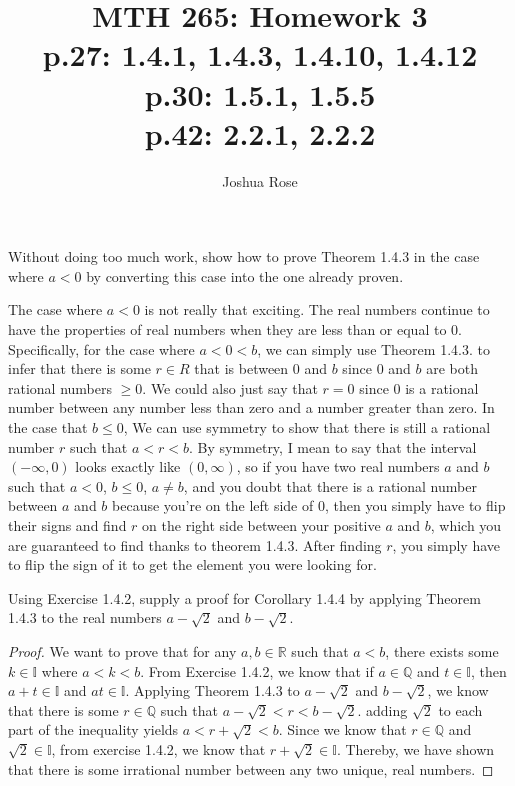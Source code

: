 \documentclass[12pt]{article}
\newcommand{\R}{\mathbb{R}}
\newcommand{\Q}{\mathbb{Q}}
\newcommand{\I}{\mathbb{I}}
\newenvironment{exercise}[2][Exercise]{\begin{trivlist}
\item[\hskip \labelsep {\bfseries #1}\hskip \labelsep {\bfseries #2.}]}{\end{trivlist}}
\begin{document}
 
 
\title{MTH 265: Homework 3\\
\normalsize 
p.27: 1.4.1, 1.4.3, 1.4.10, 1.4.12\\
p.30: 1.5.1, 1.5.5\\
p.42: 2.2.1, 2.2.2}
\author{Joshua Rose}
 
\maketitle


\begin{exercise}{1.4.1}
Without doing too much work, show how to prove Theorem 1.4.3 in the case where $a < 0$ by converting this case into the one already proven.
\end{exercise}

The case where $a < 0$ is not really that exciting. The real numbers continue to have the properties of real numbers when they are less than or equal to 0. Specifically, for the case where $a < 0 < b$, we can simply use Theorem 1.4.3. to infer that there is some $r \in R$ that is between 0 and $b$ since 0 and $b$ are both rational numbers $\geq 0$. We could also just say that $r = 0$ since 0 is a rational number between any number less than zero and a number greater than zero. In the case that $b \leq 0$, We can use symmetry to show that there is still a rational number $r$ such that $a < r < b$. By symmetry, I mean to say that the interval $(-\infty,0)$ looks exactly like $(0,\infty)$, so if you have two real numbers $a$ and $b$ such that $a < 0$, $b \leq 0$, $a\neq b$, and you doubt that there is a rational number between $a$ and $b$ because you're on the left side of 0, then you simply have to flip their signs and find $r$ on the right side between your positive $a$ and $b$, which you are guaranteed to find thanks to theorem 1.4.3. After finding $r$, you simply have to flip the sign of it to get the element you were looking for. 

\begin{exercise}{1.4.3}
Using Exercise 1.4.2, supply a proof for Corollary 1.4.4 by applying Theorem 1.4.3 to the real numbers $a-\sqrt{2}$ and $b-\sqrt{2}$.
\end{exercise}

\begin{proof}
We want to prove that for any $a, b \in \R$ such that $a<b$, there exists some $k \in \I$ where $a < k < b$. From Exercise 1.4.2, we know that if $a \in \Q$ and $t \in \I$, then $a + t \in \I$ and $at \in \I$. Applying Theorem 1.4.3 to $a-\sqrt{2}$ and $b-\sqrt{2}$, we know that there is some $r \in \Q$ such that $a-\sqrt{2} < r < b-\sqrt{2}$. adding $\sqrt{2}$ to each part of the inequality yields $a < r+\sqrt{2} < b$. Since we know that $r \in \Q$ and $\sqrt{2} \in \I$, from exercise 1.4.2, we know that $r + \sqrt{2} \in \I$. Thereby, we have shown that there is some irrational number between any two unique, real numbers. 
\end{proof}
\end{document}
